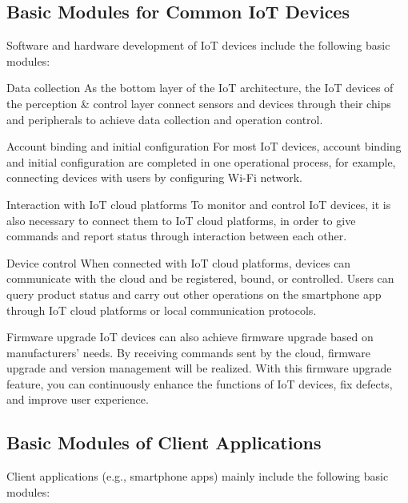 \documentclass[a4paper,12pt]{book}
\begin{document}
\subsection{Basic Modules for Common IoT Devices}
Software and hardware development of IoT devices include the following basic modules:

\begin{term}{Data collection}
    As the bottom layer of the IoT architecture, the IoT devices of the perception \& control layer connect sensors and devices through their chips and peripherals to achieve data collection and operation control.
\end{term}

\vspace{12pt}
\begin{term}{Account binding and initial configuration}
    For most IoT devices, account binding and initial configuration are completed in one operational process, for example, connecting devices with users by configuring Wi-Fi network.
\end{term}

\begin{term}{Interaction with IoT cloud platforms}
    To monitor and control IoT devices, it is also necessary to connect them to IoT cloud platforms, in order to give commands and report status through interaction between each other.
\end{term}

\begin{term}{Device control}
    When connected with IoT cloud platforms, devices can communicate with the cloud and be registered, bound, or controlled. Users can query product status and carry out other operations on the smartphone app through IoT cloud platforms or local communication protocols.
\end{term}

\begin{term}{Firmware upgrade}
    IoT devices can also achieve firmware upgrade based on manufacturers’ needs. By receiving commands sent by the cloud, firmware upgrade and version management will be realized. With this firmware upgrade feature, you can continuously enhance the functions of IoT devices, fix defects, and improve user experience.
\end{term}

\subsection{Basic Modules of Client Applications}
Client applications (e.g., smartphone apps) mainly include the following basic modules:
\end{document}
